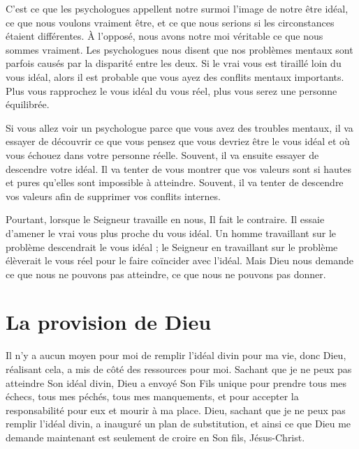 C'est ce que les psychologues appellent notre surmoi
 \ocadr l'image de notre être idéal, ce que nous voulons vraiment être,
 et ce que nous serions si les circonstances étaient différentes.
 À l'opposé, nous avons notre moi véritable
 \ocadr ce que nous sommes vraiment.
 Les psychologues nous disent que nos problèmes mentaux
 sont parfois causés par la disparité entre les deux.
 Si le vrai vous est tiraillé loin du vous idéal, alors il est probable
 que vous ayez des conflits mentaux importants.
 Plus vous rapprochez le vous idéal du vous réel,
 plus vous serez une personne équilibrée.

Si vous allez voir un psychologue parce que vous avez des troubles mentaux,
 il va essayer de découvrir ce que vous pensez que vous devriez être
 \ocadr le vous idéal \fcadr{}
 et où vous échouez dans votre personne réelle.
 Souvent, il va ensuite essayer de descendre votre idéal.
 Il va tenter de vous montrer que vos valeurs sont si hautes et pures
 qu'elles sont impossible à atteindre.
 Souvent, il va tenter de descendre vos valeurs
 afin de supprimer vos conflits internes.

Pourtant, lorsque le Seigneur travaille en nous, Il fait le contraire.
 Il essaie d'amener le vrai vous plus proche du vous idéal.
 Un homme travaillant sur le problème descendrait le vous idéal ;
 le Seigneur en travaillant sur le problème élèverait le vous réel
 pour le faire coïncider avec l'idéal.
 Mais Dieu nous demande ce que nous ne pouvons pas atteindre,
 ce que nous ne pouvons pas donner.


\section*{La provision de Dieu}

Il n'y a aucun moyen pour moi de remplir l'idéal divin
 pour ma vie, donc Dieu, réalisant cela, a mis de côté
 des ressources pour moi.
 Sachant que je ne peux pas atteindre Son idéal divin,
 Dieu a envoyé Son Fils unique pour prendre tous mes échecs,
 tous mes péchés, tous mes manquements, et pour accepter la responsabilité
 pour eux et mourir à ma place.
 Dieu, sachant que je ne peux pas remplir l'idéal divin,
 a inauguré un plan de substitution, et ainsi ce que Dieu
 me demande maintenant est seulement de croire en Son fils, Jésus-Christ.

